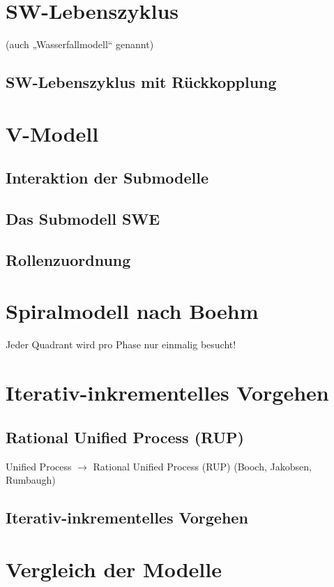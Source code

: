\section{SW-Lebenszyklus}
(auch „Wasserfallmodell“ genannt)
\subsection{SW-Lebenszyklus mit Rückkopplung}

\section{V-Modell}
\subsection{Interaktion der Submodelle}
\subsection{Das Submodell SWE}
\subsection{Rollenzuordnung}

\section{Spiralmodell nach Boehm}
Jeder Quadrant wird pro Phase nur einmalig besucht!

\section{Iterativ-inkrementelles Vorgehen}

\subsection{Rational Unified Process (RUP)}
Unified Process $\to$ Rational Unified Process (RUP) (Booch, Jakobsen, Rumbaugh)

\subsection{Iterativ-inkrementelles Vorgehen}

\section{Vergleich der Modelle}
